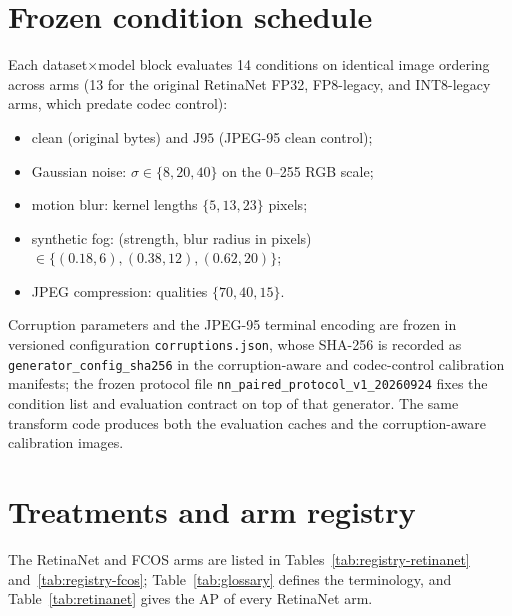 \documentclass[10pt]{article}
\newcommand{\Jclean}{\mathrm{J95}}
\begin{document}
\section{Frozen condition schedule}

Each dataset$\times$model block evaluates 14 conditions on identical image
ordering across arms (13 for the original RetinaNet FP32, FP8-legacy, and
INT8-legacy arms, which predate codec control):

\begin{itemize}
  \item clean (original bytes) and $\Jclean$ (JPEG-95 clean control);
  \item Gaussian noise: $\sigma \in \{8, 20, 40\}$ on the 0--255 RGB scale;
  \item motion blur: kernel lengths $\{5, 13, 23\}$ pixels;
  \item synthetic fog: (strength, blur radius in pixels) $\in \{(0.18,6), (0.38,12), (0.62,20)\}$;
  \item JPEG compression: qualities $\{70, 40, 15\}$.
\end{itemize}

{\sloppy Corruption parameters and the JPEG-95 terminal encoding are frozen in
versioned configuration \texttt{corruptions.json}, whose SHA-256 is recorded
as \texttt{generator\_config\_sha256} in the corruption-aware and codec-control
calibration manifests; the
frozen protocol file \texttt{nn\_paired\_protocol\_v1\_20260924} fixes the
condition list and evaluation contract on top of that generator. The same
transform code produces both the evaluation caches and the
corruption-aware calibration images.\par}

\section{Treatments and arm registry}

The RetinaNet and FCOS arms are listed in Tables~\ref{tab:registry-retinanet}
and~\ref{tab:registry-fcos}; Table~\ref{tab:glossary} defines the terminology,
and Table~\ref{tab:retinanet} gives the AP of every RetinaNet arm.
\end{document}
